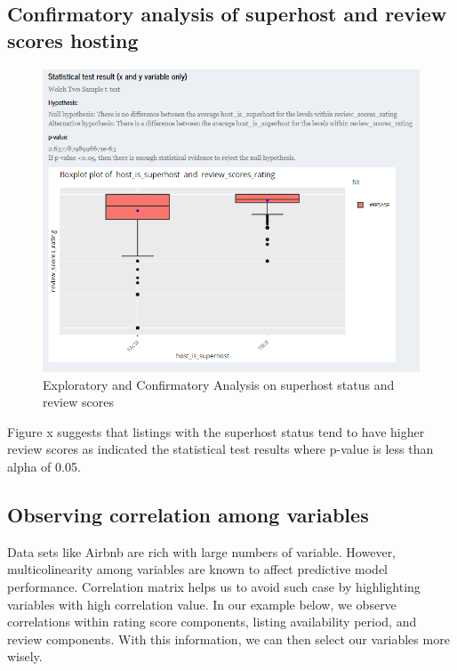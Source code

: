 \documentclass{acm_proc_article-sp}
\begin{document}
\hypertarget{confirmatory-analysis-of-superhost-and-review-scores-hosting}{%
\subsection{Confirmatory analysis of superhost and review scores
hosting}\label{confirmatory-analysis-of-superhost-and-review-scores-hosting}}

\begin{figure}[H]

{\centering \includegraphics[width=1\linewidth]{images/usecase_explore4} 

}

\caption{Exploratory and Confirmatory Analysis on superhost status and review scores}\label{fig:unnamed-chunk-19}
\end{figure}

Figure x suggests that listings with the superhost status tend to have
higher review scores as indicated the statistical test results where
p-value is less than alpha of 0.05.

\hypertarget{observing-correlation-among-variables}{%
\subsection{Observing correlation among
variables}\label{observing-correlation-among-variables}}

Data sets like Airbnb are rich with large numbers of variable. However,
multicolinearity among variables are known to affect predictive model
performance. Correlation matrix helps us to avoid such case by
highlighting variables with high correlation value. In our example
below, we observe correlations within rating score components, listing
availability period, and review components. With this information, we
can then select our variables more wisely.
\end{document}
